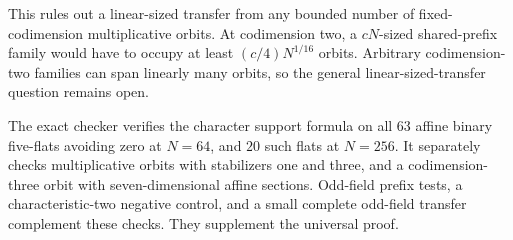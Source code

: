 This rules out a linear-sized transfer from any bounded number of
fixed-codimension multiplicative orbits. At codimension two, a
$cN$-sized shared-prefix family would have to occupy at least
$(c/4)N^{1/16}$ orbits. Arbitrary codimension-two families can span
linearly many orbits, so the general linear-sized-transfer question
remains open.

The exact checker verifies the character support formula on all
$63$ affine binary five-flats avoiding zero at $N=64$, and $20$
such flats at $N=256$. It separately checks multiplicative orbits
with stabilizers one and three, and a codimension-three orbit with
seven-dimensional affine sections. Odd-field prefix tests, a
characteristic-two negative control, and a small complete odd-field
transfer complement these checks. They supplement the universal proof.
